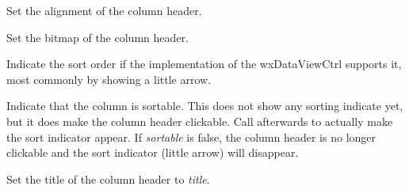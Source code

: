 
Set the alignment of the column header.

\label{wxdataviewcolumnsetbitmap}


Set the bitmap of the column header.

\label{wxdataviewcolumnsetsortorder}


Indicate the sort order if the implementation of the
wxDataViewCtrl supports it, most commonly by showing
a little arrow. 

\label{wxdataviewcolumnsetsortable}


Indicate that the column is sortable. This does
not show any sorting indicate yet, but it does
make the column header clickable. Call 
afterwards to actually make the sort indicator appear.
If {\it sortable} is false, the column header is
no longer clickable and the sort indicator (little
arrow) will disappear.

\label{wxdataviewcolumnsettitle}


Set the title of the column header to {\it title}.

